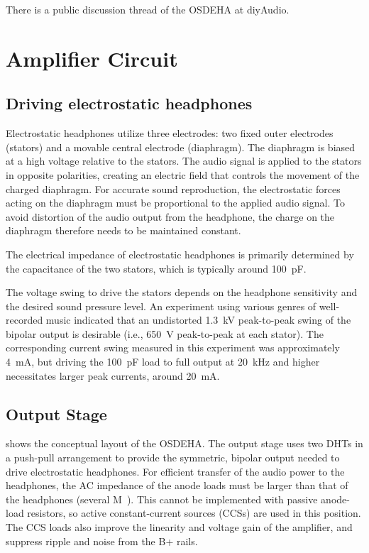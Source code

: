 There is a public discussion thread of the OSDEHA at diyAudio\cite{osdeha_p1}. 

\section{Amplifier Circuit}

\subsection{Driving electrostatic headphones} 

Electrostatic headphones utilize three electrodes: two fixed outer electrodes (stators) and a movable central electrode (diaphragm). The diaphragm is biased at a high voltage relative to the stators. The audio signal is applied to the stators in opposite polarities, creating an electric field that controls the movement of the charged diaphragm. For accurate sound reproduction, the electrostatic forces acting on the diaphragm must be proportional to the applied audio signal. To avoid distortion of the audio output from the headphone, the charge on the diaphragm therefore needs to be maintained constant.

The electrical impedance of electrostatic headphones is primarily determined by the capacitance of the two stators, which is typically around \SI{100}{pF}\cite{osdeha_p3}.

The voltage swing to drive the stators depends on the headphone sensitivity and the desired sound pressure level. An experiment using various genres of well-recorded music indicated that an undistorted \SI{1.3}{kV} peak-to-peak swing of the bipolar output is desirable (i.e., \SI{650}{V} peak-to-peak at each stator)\cite{osdeha_p8}. The corresponding current swing measured in this experiment was approximately \SI{4}{mA}, but driving the \SI{100}{pF} load to full output at \SI{20}{kHz} and higher necessitates larger peak currents, around \SI{20}{mA}\cite{osdeha_p2}.


\subsection{Output Stage}

 shows the conceptual layout of the OSDEHA. The output stage uses two DHTs in a push-pull arrangement to provide the symmetric, bipolar output needed to drive electrostatic headphones. For efficient transfer of the audio power to the headphones, the AC impedance of the anode loads must be larger than that of the headphones (several \unit{M\Ohm}). This cannot be implemented with passive anode-load resistors, so active constant-current sources (CCSs) are used in this position. The CCS loads also improve the linearity and voltage gain of the amplifier, and suppress ripple and noise from the B+ rails.

